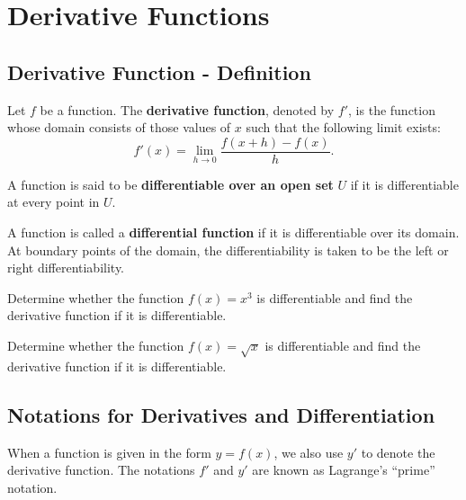 
\hypertarget{derivative-functions}{%
\section{Derivative Functions}\label{derivative-functions}}

\hypertarget{derivative-function---definition}{%
\subsection{Derivative Function -
Definition}\label{derivative-function---definition}}

\begin{definition}
Let \(f\) be a function. The \textbf{derivative function}, denoted by
\(f'\), is the function whose domain consists of those values of \(x\)
such that the following limit exists:
\[f'(x)=\lim_{h\to 0}\frac{f(x+h)-f(x)}{h}.\]

A function is said to be \textbf{differentiable over an open set} \(U\)
if it is differentiable at every point in $U$.

A function is called a \textbf{differential function} if it is
differentiable over its domain. At boundary points of the domain, the
differentiability is taken to be the left or right differentiability.
\end{definition}

\begin{example}
Determine whether the function \(f(x)=x^3\) is differentiable and find
the derivative function if it is differentiable.
\end{example}
\vspace*{6\baselineskip}

\begin{example}
Determine whether the function \(f(x)=\sqrt{x}\) is differentiable and
find the derivative function if it is differentiable.
\end{example}
\vspace*{6\baselineskip}

\hypertarget{notations-for-derivatives-and-differentiation}{%
\subsection{Notations for Derivatives and
Differentiation}\label{notations-for-derivatives-and-differentiation}}

When a function is given in the form \(y=f(x)\), we also use \(y'\) to
denote the derivative function. The notations \(f'\) and \(y'\) are
known as Lagrange's ``prime'' notation.

